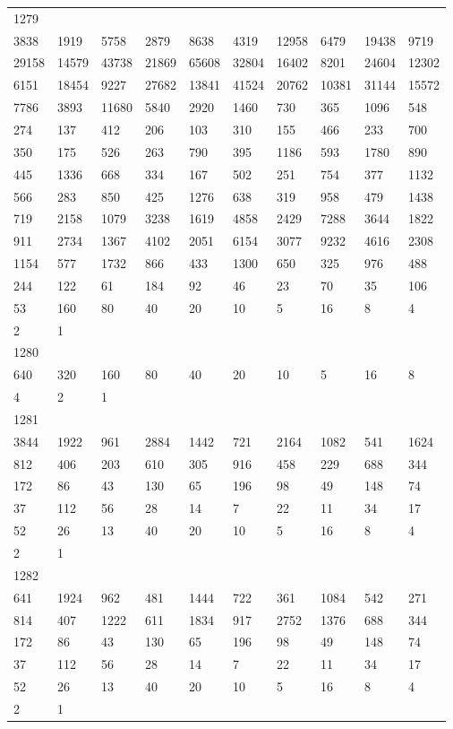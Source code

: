 \begin{longtable}{*{10}{l}}
1279&&&&&&&&&\\
3838& 1919& 5758& 2879& 8638& 4319& 12958& 6479& 19438& 9719\\
29158& 14579& 43738& 21869& 65608& 32804& 16402& 8201& 24604& 12302\\
6151& 18454& 9227& 27682& 13841& 41524& 20762& 10381& 31144& 15572\\
7786& 3893& 11680& 5840& 2920& 1460& 730& 365& 1096& 548\\
274& 137& 412& 206& 103& 310& 155& 466& 233& 700\\
350& 175& 526& 263& 790& 395& 1186& 593& 1780& 890\\
445& 1336& 668& 334& 167& 502& 251& 754& 377& 1132\\
566& 283& 850& 425& 1276& 638& 319& 958& 479& 1438\\
719& 2158& 1079& 3238& 1619& 4858& 2429& 7288& 3644& 1822\\
911& 2734& 1367& 4102& 2051& 6154& 3077& 9232& 4616& 2308\\
1154& 577& 1732& 866& 433& 1300& 650& 325& 976& 488\\
244& 122& 61& 184& 92& 46& 23& 70& 35& 106\\
53& 160& 80& 40& 20& 10& 5& 16& 8& 4\\
2& 1& \\

1280&&&&&&&&&\\
640& 320& 160& 80& 40& 20& 10& 5& 16& 8\\
4& 2& 1& \\

1281&&&&&&&&&\\
3844& 1922& 961& 2884& 1442& 721& 2164& 1082& 541& 1624\\
812& 406& 203& 610& 305& 916& 458& 229& 688& 344\\
172& 86& 43& 130& 65& 196& 98& 49& 148& 74\\
37& 112& 56& 28& 14& 7& 22& 11& 34& 17\\
52& 26& 13& 40& 20& 10& 5& 16& 8& 4\\
2& 1& \\

1282&&&&&&&&&\\
641& 1924& 962& 481& 1444& 722& 361& 1084& 542& 271\\
814& 407& 1222& 611& 1834& 917& 2752& 1376& 688& 344\\
172& 86& 43& 130& 65& 196& 98& 49& 148& 74\\
37& 112& 56& 28& 14& 7& 22& 11& 34& 17\\
52& 26& 13& 40& 20& 10& 5& 16& 8& 4\\
2& 1& \\


\end{longtable}
